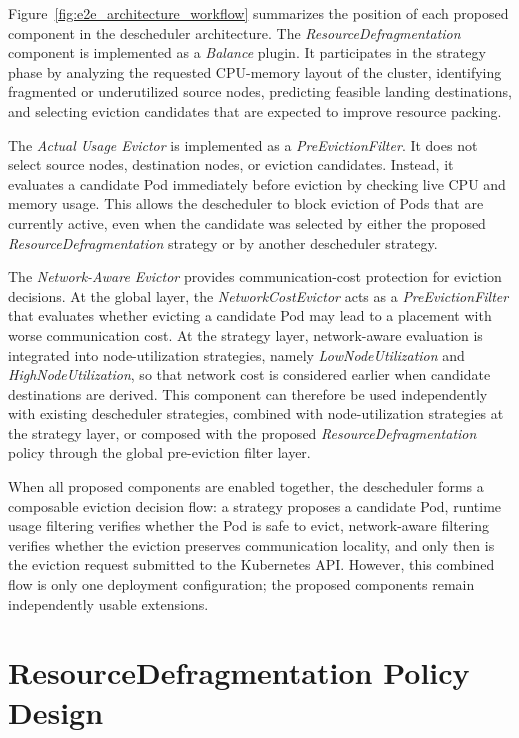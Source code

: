 Figure~\ref{fig:e2e_architecture_workflow} summarizes the position of each proposed component in the descheduler architecture. The \textit{ResourceDefragmentation} component is implemented as a \textit{Balance} plugin. It participates in the strategy phase by analyzing the requested CPU-memory layout of the cluster, identifying fragmented or underutilized source nodes, predicting feasible landing destinations, and selecting eviction candidates that are expected to improve resource packing.

The \textit{Actual Usage Evictor} is implemented as a \textit{PreEvictionFilter}. It does not select source nodes, destination nodes, or eviction candidates. Instead, it evaluates a candidate Pod immediately before eviction by checking live CPU and memory usage. This allows the descheduler to block eviction of Pods that are currently active, even when the candidate was selected by either the proposed \textit{ResourceDefragmentation} strategy or by another descheduler strategy.

The \textit{Network-Aware Evictor} provides communication-cost protection for eviction decisions. At the global layer, the \textit{NetworkCostEvictor} acts as a \textit{PreEvictionFilter} that evaluates whether evicting a candidate Pod may lead to a placement with worse communication cost. At the strategy layer, network-aware evaluation is integrated into node-utilization strategies, namely \textit{LowNodeUtilization} and \textit{HighNodeUtilization}, so that network cost is considered earlier when candidate destinations are derived. This component can therefore be used independently with existing descheduler strategies, combined with node-utilization strategies at the strategy layer, or composed with the proposed \textit{ResourceDefragmentation} policy through the global pre-eviction filter layer.

When all proposed components are enabled together, the descheduler forms a composable eviction decision flow: a strategy proposes a candidate Pod, runtime usage filtering verifies whether the Pod is safe to evict, network-aware filtering verifies whether the eviction preserves communication locality, and only then is the eviction request submitted to the Kubernetes API. However, this combined flow is only one deployment configuration; the proposed components remain independently usable extensions.

\section{ResourceDefragmentation Policy Design}
\label{sec:imbalanceindex_design}

